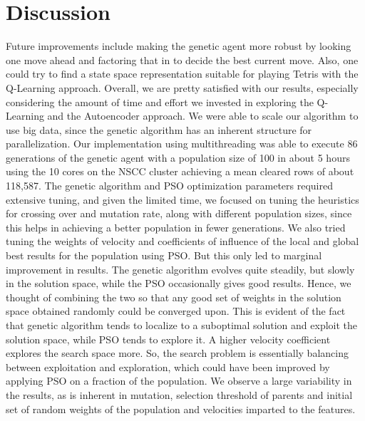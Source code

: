 \section{Discussion}
\label{sec:discussion}

Future improvements include making the genetic agent more robust by looking one move ahead and factoring that in to decide the best current move. Also, one could try to find a state space representation suitable for playing Tetris with the Q-Learning approach. Overall, we are pretty satisfied with our results, especially considering the amount of time and effort we invested in exploring the Q-Learning and the Autoencoder approach.  We were able to scale our algorithm to use big data, since the genetic algorithm has an inherent structure for parallelization. Our implementation using multithreading was able to execute 86 generations of the genetic agent with a population size of 100 in about 5 hours using the 10 cores on the NSCC cluster achieving a mean cleared rows of about 118,587. 
\newline
\newline
The genetic algorithm and PSO optimization parameters required extensive tuning, and given the limited time, we focused on tuning the heuristics for crossing over and mutation rate, along with different population sizes, since this helps in achieving a better population in fewer generations. We also tried tuning the weights of velocity and coefficients of influence of the local and global best results for the population using PSO. But this only led to marginal improvement in results. The genetic algorithm evolves quite steadily, but slowly in the solution space, while the PSO occasionally gives good results. Hence, we thought of combining the two so that any good set of weights in the solution space obtained randomly could be converged upon. This is evident of the fact that genetic algorithm tends to localize to a suboptimal solution and exploit the solution space, while PSO tends to explore it. A higher velocity coefficient explores the search space more. So, the search problem is essentially balancing between exploitation and exploration, which could have been improved by applying PSO on a fraction of the population. We observe a large variability in the results, as is inherent in mutation, selection threshold of parents and initial set of random weights of the population and velocities imparted to the features. 


